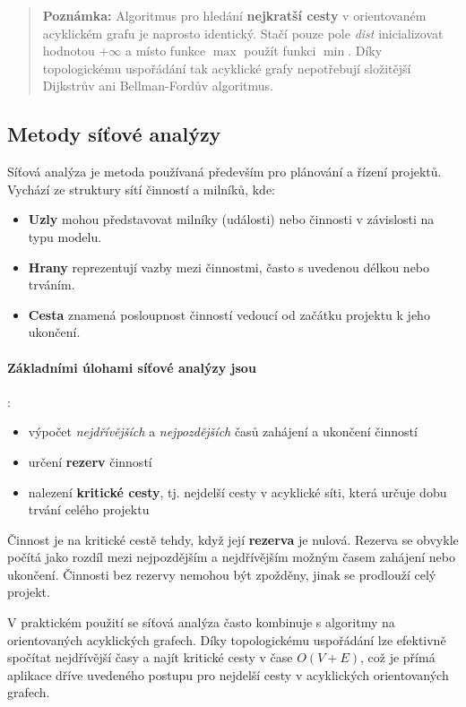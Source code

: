 \begin{quote}
\textbf{Poznámka:} Algoritmus pro hledání \textbf{nejkratší cesty} v orientovaném acyklickém grafu je naprosto identický. Stačí pouze pole \textit{dist} inicializovat hodnotou $+\infty$ a místo funkce $\max$ použít funkci $\min$. Díky topologickému uspořádání tak acyklické grafy nepotřebují složitější Dijkstrův ani Bellman-Fordův algoritmus.
\end{quote}

\subsection{Metody síťové analýzy}
Síťová analýza je metoda používaná především pro plánování a řízení projektů. Vychází ze struktury sítí činností a milníků, kde:
\begin{itemize}
    \item \textbf{Uzly} mohou představovat milníky (události) nebo činnosti v závislosti na typu modelu.
    \item \textbf{Hrany} reprezentují vazby mezi činnostmi, často s uvedenou délkou nebo trváním.
    \item \textbf{Cesta} znamená posloupnost činností vedoucí od začátku projektu k jeho ukončení.
\end{itemize}

\paragraph*{Základními úlohami síťové analýzy jsou}:
\begin{itemize}
    \item výpočet \textit{nejdřívějších} a \textit{nejpozdějších} časů zahájení a ukončení činností
    \item určení \textbf{rezerv} činností
    \item nalezení \textbf{kritické cesty}, tj. nejdelší cesty v acyklické síti, která určuje dobu trvání celého projektu
\end{itemize}

Činnost je na kritické cestě tehdy, když její \textbf{rezerva} je nulová. Rezerva se obvykle počítá jako rozdíl mezi nejpozdějším a nejdřívějším možným časem zahájení nebo ukončení. Činnosti bez rezervy nemohou být zpožděny, jinak se prodlouží celý projekt.

V praktickém použití se síťová analýza často kombinuje s algoritmy na orientovaných acyklických grafech. Díky topologickému uspořádání lze efektivně spočítat nejdřívější časy a najít kritické cesty v čase $O(V + E)$, což je přímá aplikace dříve uvedeného postupu pro nejdelší cesty v acyklických orientovaných grafech.

